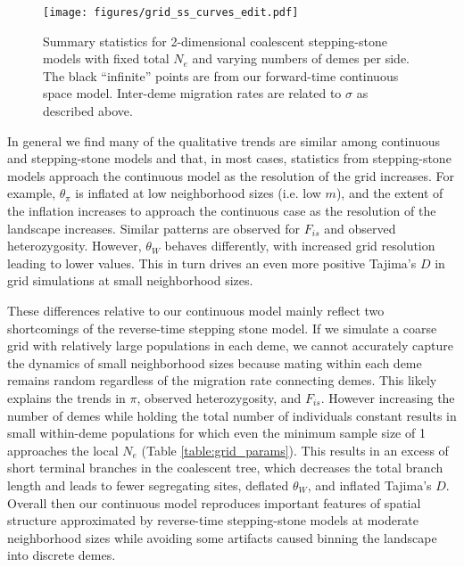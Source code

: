 \documentclass[10pt,twoside,lineno,hidelinks]{preprint}
\begin{document}
\begin{figure}[h]
\centering
\texttt{[image: figures/grid\_ss\_curves\_edit.pdf]}
\caption{Summary statistics for 2-dimensional coalescent stepping-stone models with fixed total $N_{e}$ and varying numbers of demes per side. The black ``infinite'' points are from our forward-time continuous space model. Inter-deme migration rates are related to $\sigma$ as described above.}
\label{fig:grid_stats}
\end{figure}

In general we find many of the qualitative trends are similar among continuous and stepping-stone models and that, in most cases, statistics from stepping-stone models approach the continuous model as the resolution of the grid increases. For example, $\theta_\pi$ is inflated at low neighborhood sizes (i.e. low $m$), and the extent of the inflation increases to approach the continuous case as the resolution of the landscape increases. Similar patterns are observed for $F_{is}$ and observed heterozygosity. However, $\theta_{W}$ behaves differently, with increased grid resolution leading to lower values. This in turn drives an even more positive Tajima's $D$ in grid simulations at small neighborhood sizes.

These differences relative to our continuous model mainly reflect two shortcomings of the reverse-time stepping stone model. If we simulate a coarse grid with relatively large populations in each deme, we cannot accurately capture the dynamics of small neighborhood sizes because mating within each deme remains random regardless of the migration rate connecting demes. This likely explains the trends in $\pi$, observed heterozygosity, and $F_{is}$. However increasing the number of demes while holding the total number of individuals constant results in small within-deme populations for which even the minimum sample size of 1 approaches the local $N_e$ (Table \ref{table:grid_params}). This results in an excess of short terminal branches in the coalescent tree, which decreases the total branch length and leads to fewer segregating sites, deflated $\theta_W$, and inflated Tajima's $D$. Overall then our continuous model reproduces important features of spatial structure approximated by reverse-time stepping-stone models at moderate neighborhood sizes while avoiding some artifacts caused binning the landscape into discrete demes. 

\end{document}
